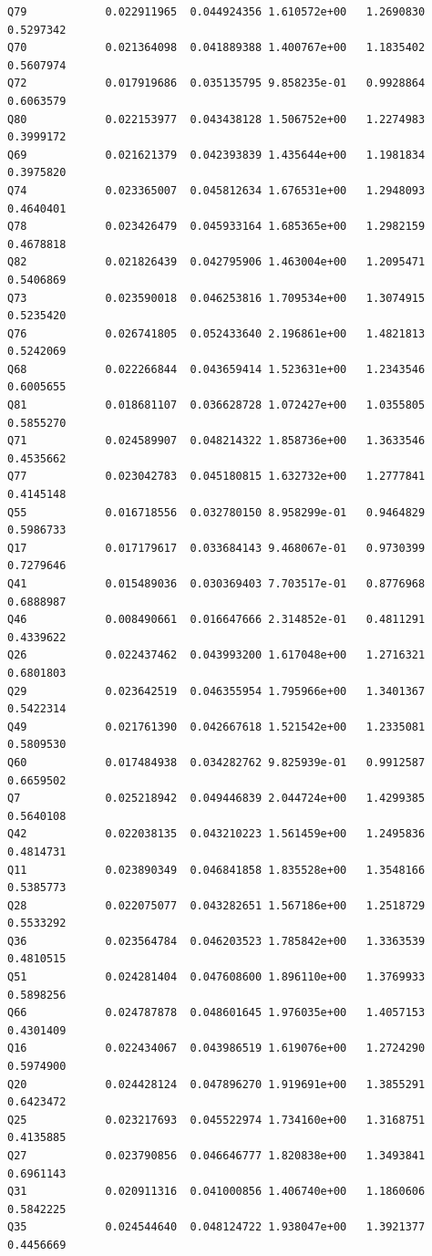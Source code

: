 \documentclass[
]{report}
\begin{document}
\begin{verbatim}
Q79            0.022911965  0.044924356 1.610572e+00   1.2690830 0.5297342
Q70            0.021364098  0.041889388 1.400767e+00   1.1835402 0.5607974
Q72            0.017919686  0.035135795 9.858235e-01   0.9928864 0.6063579
Q80            0.022153977  0.043438128 1.506752e+00   1.2274983 0.3999172
Q69            0.021621379  0.042393839 1.435644e+00   1.1981834 0.3975820
Q74            0.023365007  0.045812634 1.676531e+00   1.2948093 0.4640401
Q78            0.023426479  0.045933164 1.685365e+00   1.2982159 0.4678818
Q82            0.021826439  0.042795906 1.463004e+00   1.2095471 0.5406869
Q73            0.023590018  0.046253816 1.709534e+00   1.3074915 0.5235420
Q76            0.026741805  0.052433640 2.196861e+00   1.4821813 0.5242069
Q68            0.022266844  0.043659414 1.523631e+00   1.2343546 0.6005655
Q81            0.018681107  0.036628728 1.072427e+00   1.0355805 0.5855270
Q71            0.024589907  0.048214322 1.858736e+00   1.3633546 0.4535662
Q77            0.023042783  0.045180815 1.632732e+00   1.2777841 0.4145148
Q55            0.016718556  0.032780150 8.958299e-01   0.9464829 0.5986733
Q17            0.017179617  0.033684143 9.468067e-01   0.9730399 0.7279646
Q41            0.015489036  0.030369403 7.703517e-01   0.8776968 0.6888987
Q46            0.008490661  0.016647666 2.314852e-01   0.4811291 0.4339622
Q26            0.022437462  0.043993200 1.617048e+00   1.2716321 0.6801803
Q29            0.023642519  0.046355954 1.795966e+00   1.3401367 0.5422314
Q49            0.021761390  0.042667618 1.521542e+00   1.2335081 0.5809530
Q60            0.017484938  0.034282762 9.825939e-01   0.9912587 0.6659502
Q7             0.025218942  0.049446839 2.044724e+00   1.4299385 0.5640108
Q42            0.022038135  0.043210223 1.561459e+00   1.2495836 0.4814731
Q11            0.023890349  0.046841858 1.835528e+00   1.3548166 0.5385773
Q28            0.022075077  0.043282651 1.567186e+00   1.2518729 0.5533292
Q36            0.023564784  0.046203523 1.785842e+00   1.3363539 0.4810515
Q51            0.024281404  0.047608600 1.896110e+00   1.3769933 0.5898256
Q66            0.024787878  0.048601645 1.976035e+00   1.4057153 0.4301409
Q16            0.022434067  0.043986519 1.619076e+00   1.2724290 0.5974900
Q20            0.024428124  0.047896270 1.919691e+00   1.3855291 0.6423472
Q25            0.023217693  0.045522974 1.734160e+00   1.3168751 0.4135885
Q27            0.023790856  0.046646777 1.820838e+00   1.3493841 0.6961143
Q31            0.020911316  0.041000856 1.406740e+00   1.1860606 0.5842225
Q35            0.024544640  0.048124722 1.938047e+00   1.3921377 0.4456669

\end{verbatim}
\end{document}
